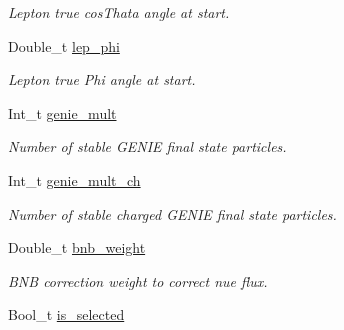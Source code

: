 \begin{DoxyCompactItemize}
\begin{DoxyCompactList}\small\item\em Lepton true cos\-Thata angle at start. \end{DoxyCompactList}\item 
\hypertarget{classUBXSecEvent_a7b4229f9ab6a20424bffd9ef5a57edc6}{Double\-\_\-t \hyperlink{classUBXSecEvent_a7b4229f9ab6a20424bffd9ef5a57edc6}{lep\-\_\-phi}}\label{classUBXSecEvent_a7b4229f9ab6a20424bffd9ef5a57edc6}

\begin{DoxyCompactList}\small\item\em Lepton true Phi angle at start. \end{DoxyCompactList}\item 
\hypertarget{classUBXSecEvent_a767300e775e92348238668ef99dfdbc8}{Int\-\_\-t \hyperlink{classUBXSecEvent_a767300e775e92348238668ef99dfdbc8}{genie\-\_\-mult}}\label{classUBXSecEvent_a767300e775e92348238668ef99dfdbc8}

\begin{DoxyCompactList}\small\item\em Number of stable G\-E\-N\-I\-E final state particles. \end{DoxyCompactList}\item 
\hypertarget{classUBXSecEvent_a6a73137488dc2af0dc6abd5868fbbe4d}{Int\-\_\-t \hyperlink{classUBXSecEvent_a6a73137488dc2af0dc6abd5868fbbe4d}{genie\-\_\-mult\-\_\-ch}}\label{classUBXSecEvent_a6a73137488dc2af0dc6abd5868fbbe4d}

\begin{DoxyCompactList}\small\item\em Number of stable charged G\-E\-N\-I\-E final state particles. \end{DoxyCompactList}\item 
\hypertarget{classUBXSecEvent_a38aa9da115c68ecd02cfa2da1f2d50a2}{Double\-\_\-t \hyperlink{classUBXSecEvent_a38aa9da115c68ecd02cfa2da1f2d50a2}{bnb\-\_\-weight}}\label{classUBXSecEvent_a38aa9da115c68ecd02cfa2da1f2d50a2}

\begin{DoxyCompactList}\small\item\em B\-N\-B correction weight to correct nue flux. \end{DoxyCompactList}\item 
\hypertarget{classUBXSecEvent_a6af1830fbdf3bb5df9087095941cf8ec}{Bool\-\_\-t \hyperlink{classUBXSecEvent_a6af1830fbdf3bb5df9087095941cf8ec}{is\-\_\-selected}}\label{classUBXSecEvent_a6af1830fbdf3bb5df9087095941cf8ec}


\end{DoxyCompactItemize}
